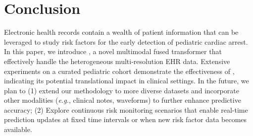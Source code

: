 \section{Conclusion}
Electronic health records contain a wealth of patient information that can be leveraged to study risk factors for the early detection of pediatric cardiac arrest. 
In this paper, we introduce \modelname, a novel multimodal fused transformer that effectively handle the heterogeneous multi-resolution EHR data. Extensive experiments on a curated pediatric cohort demonstrate the effectiveness of \modelname, indicating its potential translational impact in clinical settings.
In the future, we plan to (1) extend our methodology to more diverse datasets and incorporate other modalities (\textit{e.g.}, clinical notes, waveforms) to further enhance predictive accuracy; (2) Explore continuous risk monitoring scenarios that enable real-time prediction updates at fixed time intervals or when new risk factor data becomes available.